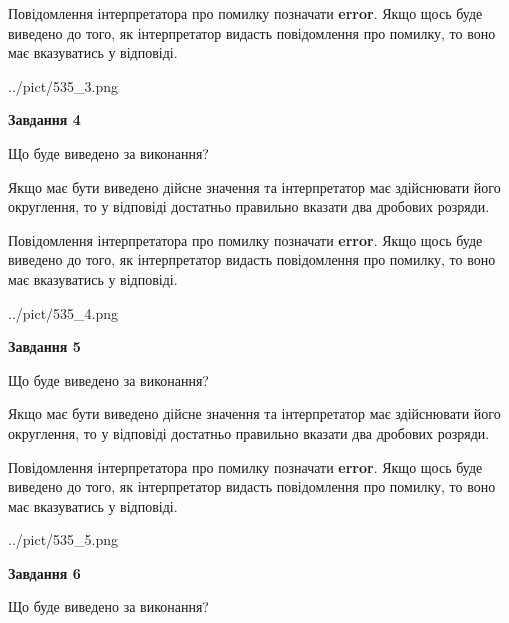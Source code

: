 \documentclass[12pt, ukrainian]{article}
\begin{document}
{\begin {Large}
Повідомлення інтерпретатора про помилку позначати \textbf{error}.
Якщо щось буде виведено до того, як інтерпретатор видасть повідомлення про помилку, 
то воно має вказуватись у відповіді. \par

\begin{center}
	{../pict/535_3.png}
\end{center}
\newpage

{\begin {center}\textbf{Завдання 4}\end {center}}\par
Що буде виведено за виконання? \par

Якщо має бути виведено дійсне значення та інтерпретатор має здійснювати його округлення, 
то у відповіді достатньо правильно вказати два дробових розряди.

Повідомлення інтерпретатора про помилку позначати \textbf{error}.
Якщо щось буде виведено до того, як інтерпретатор видасть повідомлення про помилку, 
то воно має вказуватись у відповіді. \par

\begin{center}
	{../pict/535_4.png}
\end{center}
\newpage

{\begin {center}\textbf{Завдання 5}\end {center}}\par
Що буде виведено за виконання? \par

Якщо має бути виведено дійсне значення та інтерпретатор має здійснювати його округлення, 
то у відповіді достатньо правильно вказати два дробових розряди.

Повідомлення інтерпретатора про помилку позначати \textbf{error}.
Якщо щось буде виведено до того, як інтерпретатор видасть повідомлення про помилку, 
то воно має вказуватись у відповіді. \par

\begin{center}
	{../pict/535_5.png}
\end{center}
\newpage

{\begin {center}\textbf{Завдання 6}\end {center}}\par
Що буде виведено за виконання? \par


\end{Large}}
\end{document}
